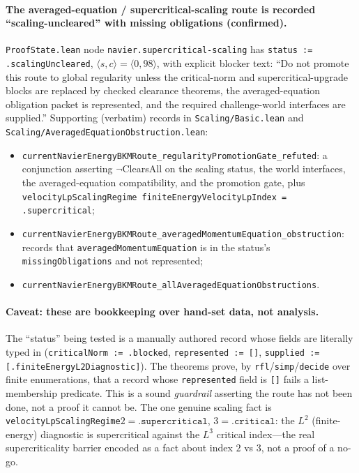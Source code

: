 \paragraph{The averaged-equation / supercritical-scaling route is recorded
``scaling-uncleared'' with missing obligations (confirmed).}
\texttt{ProofState.lean} node \texttt{navier.supercritical-scaling} has
\texttt{status := .scalingUncleared}, $\langle s,c\rangle=\langle
0,98\rangle$, with explicit blocker text: ``Do not promote this route to global
regularity unless the critical-norm and supercritical-upgrade blocks are
replaced by checked clearance theorems, the averaged-equation obligation packet
is represented, and the required challenge-world interfaces are supplied.''
Supporting (verbatim) records in \texttt{Scaling/Basic.lean} and
\texttt{Scaling/AveragedEquationObstruction.lean}:
\begin{itemize}
  \item \texttt{currentNavierEnergyBKMRoute\_regularityPromotionGate\_refuted}:
  a conjunction asserting $\lnot$ClearsAll on the scaling status, the world
  interfaces, the averaged-equation compatibility, and the promotion gate, plus
  \texttt{velocityLpScalingRegime finiteEnergyVelocityLpIndex = .supercritical};
  \item \texttt{currentNavierEnergyBKMRoute\_averagedMomentumEquation\_obstruction}:
  records that \texttt{averagedMomentumEquation} is in the status's
  \texttt{missingObligations} and not represented;
  \item \texttt{currentNavierEnergyBKMRoute\_allAveragedEquationObstructions}.
\end{itemize}

\paragraph{Caveat: these are bookkeeping over hand-set data, not analysis.} The
``status'' being tested is a manually authored record whose fields are literally
typed in (\texttt{criticalNorm := .blocked}, \texttt{represented := []},
\texttt{supplied := [.finiteEnergyL2Diagnostic]}). The theorems prove, by
\texttt{rfl}/\texttt{simp}/\texttt{decide} over finite enumerations, that a
record whose \texttt{represented} field is \texttt{[]} fails a list-membership
predicate. This is a sound \emph{guardrail} asserting the route has not been
done, not a proof it cannot be. The one genuine scaling fact is
\texttt{velocityLpScalingRegime}\;$2=\texttt{.supercritical}$,
$3=\texttt{.critical}$: the $L^2$ (finite-energy) diagnostic is supercritical
against the $L^3$ critical index---the real supercriticality barrier encoded as
a fact about index $2$ vs $3$, not a proof of a no-go.

